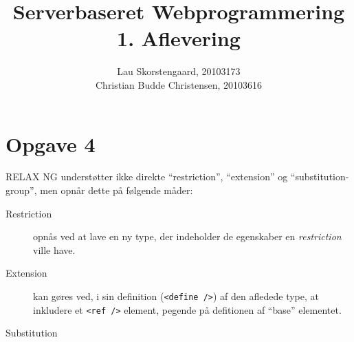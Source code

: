 \documentclass[a4paper,10pt]{article}
\author{Lau Skorstengaard, 20103173 \\Christian Budde Christensen, 20103616}
\title{Serverbaseret Webprogrammering\\1. Aflevering}
\begin{document}
 
\maketitle

\section*{Opgave 4}
RELAX NG understøtter ikke direkte ``restriction'', ``extension'' og ``substitution-group'', men opnår dette på følgende måder:
\begin{description}
\item[Restriction] opnås ved at lave en ny type, der indeholder de egenskaber en \textit{restriction} ville have. 
\item[Extension] kan gøres ved, i sin definition (\texttt{<define />}) af den afledede type, at inkludere et \texttt{<ref />} element, pegende på defitionen af ``base'' elementet. 
\item[Substitution]  
\end{description} 
\end{document}
